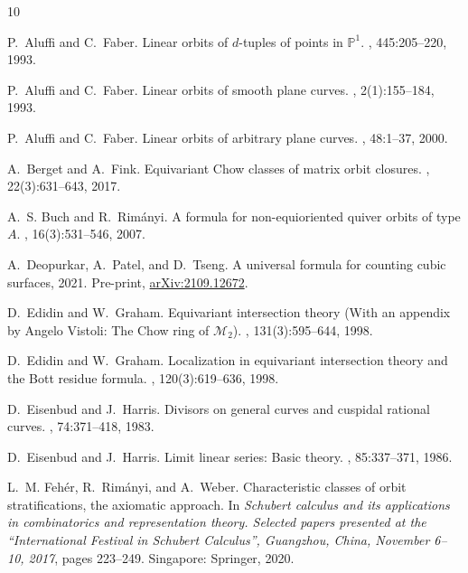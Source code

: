 \documentclass[11pt]{amsart}
\begin{document}

\begin{thebibliography}{10}

P.~Aluffi and C.~Faber.
\newblock Linear orbits of {{\(d\)}}-tuples of points in {{\(\mathbb{P}^ 1\)}}.
, 445:205--220, 1993.

P.~Aluffi and C.~Faber.
\newblock Linear orbits of smooth plane curves.
, 2(1):155--184, 1993.

P.~Aluffi and C.~Faber.
\newblock Linear orbits of arbitrary plane curves.
, 48:1--37, 2000.

A.~Berget and A.~Fink.
\newblock Equivariant {C}how classes of matrix orbit closures.
, 22(3):631--643, 2017.

A.~S. Buch and R.~Rim{\'a}nyi.
\newblock A formula for non-equioriented quiver orbits of type {{\(A\)}}.
, 16(3):531--546, 2007.

A.~Deopurkar, A.~Patel, and D.~Tseng.
\newblock A universal formula for counting cubic surfaces, 2021.
\newblock Pre-print, \href{https://arxiv.org/abs/2109.12672}{arXiv:2109.12672}.

D.~Edidin and W.~Graham.
\newblock Equivariant intersection theory ({With} an appendix by {Angelo}
  {Vistoli}: {The} {Chow} ring of {{\({\mathcal M}_2\)}}).
, 131(3):595--644, 1998.

D.~Edidin and W.~Graham.
\newblock Localization in equivariant intersection theory and the {Bott}
  residue formula.
, 120(3):619--636, 1998.

D.~Eisenbud and J.~Harris.
\newblock Divisors on general curves and cuspidal rational curves.
, 74:371--418, 1983.

D.~Eisenbud and J.~Harris.
\newblock Limit linear series: {Basic} theory.
, 85:337--371, 1986.

L.~M. Feh{\'e}r, R.~Rim{\'a}nyi, and A.~Weber.
\newblock Characteristic classes of orbit stratifications, the axiomatic
  approach.
\newblock In {\em Schubert calculus and its applications in combinatorics and
  representation theory. Selected papers presented at the ``International
  Festival in Schubert Calculus'', Guangzhou, China, November 6--10, 2017},
  pages 223--249. Singapore: Springer, 2020.


\end{thebibliography}
\end{document}
